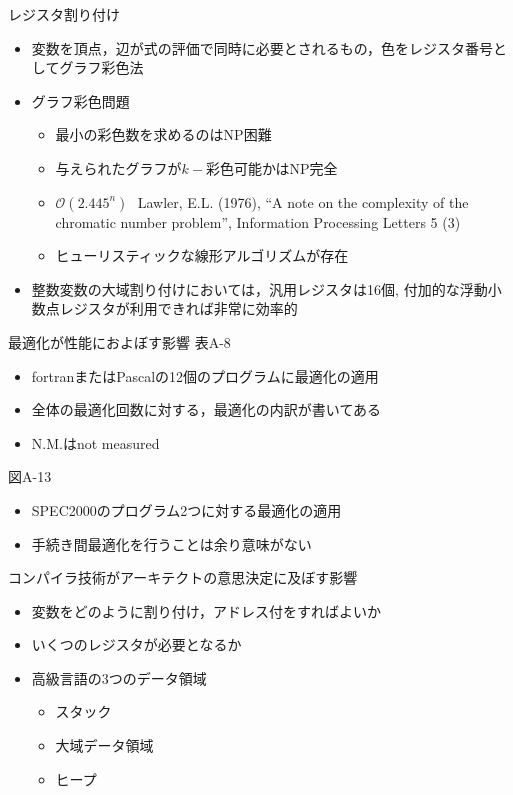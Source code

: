\documentclass[dvipdfmx]{beamer}
\begin{document}
	\begin{frame}{レジスタ割り付け}
		\begin{itemize}
			\item 変数を頂点，辺が式の評価で同時に必要とされるもの，色をレジスタ番号としてグラフ彩色法
			\item グラフ彩色問題
				\begin{itemize}
					\item 最小の彩色数を求めるのはNP困難
					\item 与えられたグラフが$k-$彩色可能かはNP完全
					\item $\mathcal{O}(2.445^n)\ \ \ $Lawler, E.L. (1976), “A note on the complexity of the chromatic number problem”, Information Processing Letters 5 (3)
					\item ヒューリスティックな線形アルゴリズムが存在
				\end{itemize}
			\item 整数変数の大域割り付けにおいては，汎用レジスタは16個, 付加的な浮動小数点レジスタが利用できれば非常に効率的
		\end{itemize}
	\end{frame}

	\begin{frame}{最適化が性能におよぼす影響}
		表A-8
		\begin{itemize}
			\item fortranまたはPascalの12個のプログラムに最適化の適用
			\item 全体の最適化回数に対する，最適化の内訳が書いてある
			\item N.M.はnot measured
		\end{itemize}
		図A-13
		\begin{itemize}
			\item SPEC2000のプログラム2つに対する最適化の適用
			\item 手続き間最適化を行うことは余り意味がない
		\end{itemize}
	\end{frame}
	\begin{frame}{コンパイラ技術がアーキテクトの意思決定に及ぼす影響}
		\begin{itemize}
			\item 変数をどのように割り付け，アドレス付をすればよいか
			\item いくつのレジスタが必要となるか
			\item 高級言語の3つのデータ領域
				\begin{itemize}
					\item スタック
					\item 大域データ領域
					\item ヒープ
				\end{itemize}
		\end{itemize}
	\end{frame}
\end{document}
